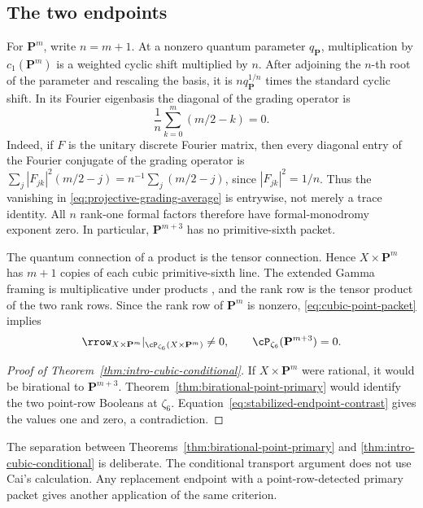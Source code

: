 \subsection{The two endpoints}

For \(\mathbf P^m\), write \(n=m+1\).  At a nonzero quantum parameter
\(q_{\mathbf P}\),
multiplication by \(c_1(\mathbf P^m)\) is a weighted cyclic shift multiplied
by \(n\).  After adjoining the \(n\)-th root of the parameter and rescaling
the basis, it is \(nq_{\mathbf P}^{1/n}\) times the standard cyclic shift.  In its
Fourier eigenbasis the diagonal of the grading operator is
\begin{equation}\label{eq:projective-grading-average}
 \frac1n\sum_{k=0}^{m}(m/2-k)=0.
\end{equation}
Indeed, if \(F\) is the unitary discrete Fourier matrix, then every diagonal
entry of the Fourier conjugate of the grading operator is
\(\sum_j |F_{jk}|^2(m/2-j)=n^{-1}\sum_j(m/2-j)\), since
\(|F_{jk}|^2=1/n\).  Thus the vanishing in
\eqref{eq:projective-grading-average} is entrywise, not merely a trace
identity.
All \(n\) rank-one formal factors therefore have formal-monodromy exponent
zero.  In particular, \(\mathbf P^{m+3}\) has no primitive-sixth packet.

The quantum connection of a product is the tensor connection.  Hence
\(X\times\mathbf P^m\) has \(m+1\) copies of each cubic primitive-sixth line.
The extended Gamma framing is multiplicative under products
\cite[Remark~1.2]{IritaniGamma}, and the rank row is the tensor product of
the two rank rows.  Since the rank row of \(\mathbf P^m\) is nonzero,
\eqref{eq:cubic-point-packet} implies
\begin{equation}\label{eq:stabilized-endpoint-contrast}
 \rrow_{X\times\mathbf P^m}
   |_{\cP_{\zeta_6}(X\times\mathbf P^m)}\ne0,
 \qquad
 \cP_{\zeta_6}(\mathbf P^{m+3})=0.
\end{equation}

\begin{proof}[Proof of Theorem~\ref{thm:intro-cubic-conditional}]
If \(X\times\mathbf P^m\) were rational, it would be birational to
\(\mathbf P^{m+3}\).  Theorem~\ref{thm:birational-point-primary} would identify
the two point-row Booleans at \(\zeta_6\).
Equation~\eqref{eq:stabilized-endpoint-contrast} gives the values
one and zero, a contradiction.
\end{proof}

The separation between Theorems~\ref{thm:birational-point-primary} and
\ref{thm:intro-cubic-conditional} is deliberate.  The conditional transport
argument does not use Cai's calculation.  Any replacement endpoint with a
point-row-detected primary packet gives another application of the same
criterion.
